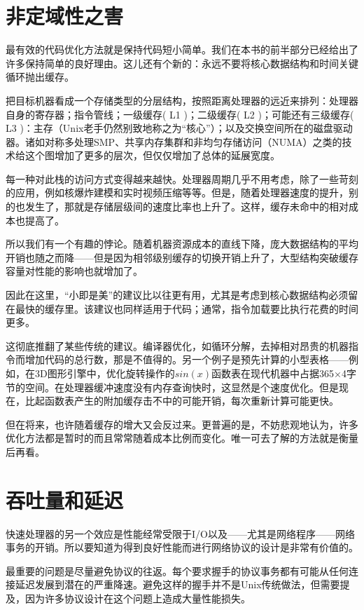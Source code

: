 \documentclass[12pt,oneside]{book}
\begin{document}
\begin{common-format}
\section{非定域性之害}
最有效的代码优化方法就是保持代码短小简单。我们在本书的前半部分已经给出了许多保持简单的良好理由。这儿还有个新的：永远不要将核心数据结构和时间关键循环抛出缓存。

把目标机器看成一个存储类型的分层结构，按照距离处理器的远近来排列：处理器自身的寄存器；指令管线；一级缓存( L1 )；二级缓存( L2 )；可能还有三级缓存( L3 )：主存（Unix老手仍然别致地称之为“核心”）；以及交换空间所在的磁盘驱动器。诸如对称多处理SMP、共享内存集群和非均匀存储访问（NUMA）之类的技术给这个图增加了更多的层次，但仅仅增加了总体的延展宽度。

每一种对此栈的访问方式变得越来越快。处理器周期几乎不用考虑，除了一些苛刻的应用，例如核爆炸建模和实时视频压缩等等。但是，随着处理器速度的提升，别的也发生了，那就是存储层级间的速度比率也上升了。这样，缓存未命中的相对成本也提高了。

所以我们有一个有趣的悖论。随着机器资源成本的直线下降，庞大数据结构的平均开销也随之而降——但是因为相邻级别缓存的切换开销上升了，大型结构突破缓存容量对性能的影响也就增加了。

因此在这里，“小即是美”的建议比以往更有用，尤其是考虑到核心数据结构必须留在最快的缓存里。该建议也同样适用于代码；通常，指令加载要比执行花费的时间更多。

这彻底推翻了某些传统的建议。编译器优化，如循环分解，去掉相对昂贵的机器指令而增加代码的总行数，那是不值得的。另一个例子是预先计算的小型表格——例如，在3D图形引擎中，优化旋转操作的$ sin(x) $函数表在现代机器中占据365×4字节的空间。在处理器缓冲速度没有内存查询快时，这显然是个速度优化。但是现在，比起函数表产生的附加缓存击不中的可能开销，每次重新计算可能更快。

但在将来，也许随着缓存的增大又会反过来。更普遍的是，不妨悲观地认为，许多优化方法都是暂时的而且常常随着成本比例而变化。唯一可去了解的方法就是衡量后再看。

\section{吞吐量和延迟}
快速处理器的另一个效应是性能经常受限于I/O以及——尤其是网络程序——网络事务的开销。所以要知道为得到良好性能而进行网络协议的设计是非常有价值的。

最重要的问题是尽量避免协议的往返。每个要求握手的协议事务都有可能从任何连接延迟发展到潜在的严重降速。避免这样的握手并不是Unix传统做法，但需要提及，因为许多协议设计在这个问题上造成大量性能损失。


\end{common-format}
\end{document}
